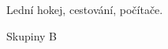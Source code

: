 



\begin{cvhonors}

  \cvhonor
    {} %
    {Lední hokej, cestování, počítače.} %

\end{cvhonors}
\vspace{5pt}



\begin{cvhonors}

  \cvhonor
    {}%
    {Skupiny B} %



\end{cvhonors}
\vspace{5pt}

